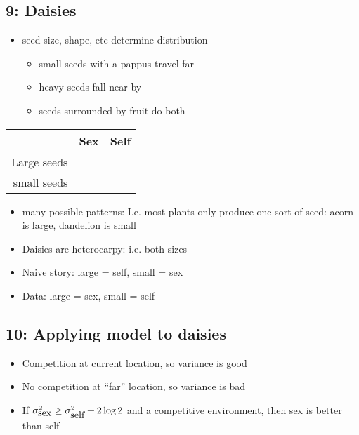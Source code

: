 \documentclass[12pt,twocolumn]{article}
\begin{document}
\subsection*{9: Daisies}
\begin{itemize}
\item seed size, shape, etc determine distribution
\begin{itemize}
\item small seeds with a pappus travel far
\item heavy seeds fall near by
\item seeds surrounded by fruit do both
\end{itemize}
\end{itemize}
\begin{tabular}{r|c|c}
              & Sex      &    Self    \\ \hline
Large seeds   &          &            \\ \hline
small seeds   &          &            \\
\end{tabular}
\begin{itemize}
\item many possible patterns: I.e. most plants only produce one sort
of seed: acorn is large, dandelion is small 
\item Daisies are heterocarpy: i.e. both sizes
\item Naive story: large = self, small = sex
\item Data: large = sex, small = self
\end{itemize}

\subsection*{10: Applying model to daisies}
\begin{itemize}
\item Competition at current location, so variance is good
\item No competition at ``far'' location, so variance is bad
\item If $\sigma^2_{\hbox{sex}} \ge \sigma^2_{\hbox{self}} + 2\log 2$
and a competitive environment, then sex is better than self
\end{itemize}

\end{document}
